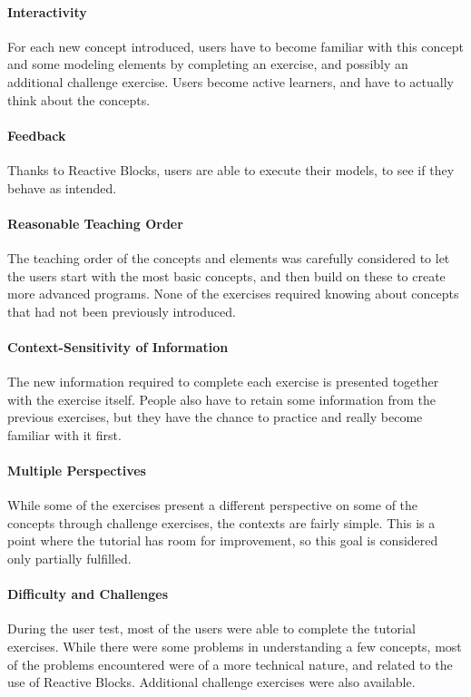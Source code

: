 \paragraph{Interactivity} For each new concept introduced, users have to become familiar with this concept and some modeling elements by completing an exercise, and possibly an additional challenge exercise. Users become active learners, and have to actually think about the concepts.

\paragraph{Feedback} Thanks to Reactive Blocks, users are able to execute their models, to see if they behave as intended.

\paragraph{Reasonable Teaching Order} The teaching order of the concepts and elements was carefully considered to let the users start with the most basic concepts, and then build on these to create more advanced programs. None of the exercises required knowing about concepts that had not been previously introduced.

\paragraph{Context-Sensitivity of Information} The new information required to complete each exercise is presented together with the exercise itself. People also have to retain some information from the previous exercises, but they have the chance to practice and really become familiar with it first.

\paragraph{Multiple Perspectives} While some of the exercises present a different perspective on some of the concepts through challenge exercises, the contexts are fairly simple. This is a point where the tutorial has room for improvement, so this goal is considered only partially fulfilled.

\paragraph{Difficulty and Challenges} During the user test, most of the users were able to complete the tutorial exercises. While there were some problems in understanding a few concepts, most of the problems encountered were of a more technical nature, and related to the use of Reactive Blocks. Additional challenge exercises were also available.

